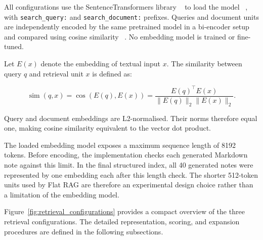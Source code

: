 \documentclass[runningheads]{llncs}
\begin{document}
All configurations use the SentenceTransformers library
~\cite{reimers2019sentence} to load the
 model
~\cite{nussbaum2024nomic}, with \texttt{search\_query:} and
\texttt{search\_\allowbreak{}document:} prefixes. Queries and document
units are independently encoded by the same pretrained model in a
bi-encoder setup and compared using cosine similarity
~\cite{reimers2019sentence,karpukhin2020dense}. No embedding model is
trained or fine-tuned.

Let \(E(x)\) denote the embedding of textual input \(x\). The similarity
between query \(q\) and retrieval unit \(x\) is defined as:

\[
\operatorname{sim}(q,x)
=
\cos\left(E(q),E(x)\right)
=
\frac{
    E(q)^{\top}E(x)
}{
    \lVert E(q)\rVert_2
    \lVert E(x)\rVert_2
}.
\]

Query and document embeddings are L2-normalised. Their norms therefore
equal one, making cosine similarity equivalent to the vector dot
product.

The loaded embedding model exposes a maximum sequence length of
8192 tokens. Before encoding, the implementation checks each generated
Markdown note against this limit. In the final structured index, all
40 generated notes were represented by one embedding each after this
length check. The shorter 512-token units used by Flat RAG are therefore
an experimental design choice rather than a limitation of the embedding
model.

Figure~\ref{fig:retrieval_configurations} provides a compact overview
of the three retrieval configurations. The detailed representation,
scoring, and expansion procedures are defined in the following
subsections.
\end{document}
